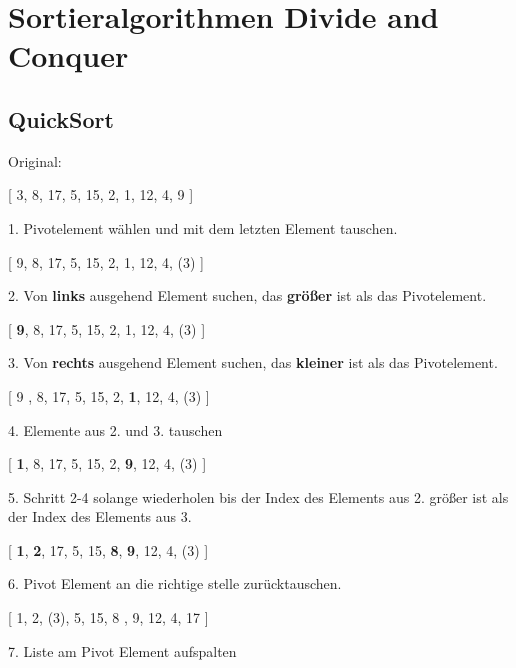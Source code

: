 \documentclass[12pt]{article}
\begin{document}
\section{Sortieralgorithmen Divide and Conquer}
\subsection{QuickSort}
\begin{center}
	Original:
\end{center}
\vspace{-0.8cm}
 \begin{center}
 	

 [ 3, 8, 17, 5, 15, 2, 1, 12, 4, 9 ]
 \end{center}
1. Pivotelement wählen und mit dem letzten Element tauschen.
 \begin{center}
	[ 9, 8, 17, 5, 15, 2, 1, 12, 4, (3) ]
\end{center}
2. Von \textbf{links} ausgehend Element suchen, das \textbf{größer} ist als das Pivotelement.

 \begin{center}
	[ \textbf{9}, 8, 17, 5, 15, 2, 1, 12, 4, (3) ]
\end{center}

3. Von \textbf{rechts} ausgehend Element suchen, das \textbf{kleiner} ist als das Pivotelement.

\begin{center}
	[ 9 , 8, 17, 5, 15, 2, \textbf{1}, 12, 4, (3) ]
\end{center}




4. Elemente aus 2. und 3. tauschen
\begin{center}
	[ \textbf{1}, 8, 17, 5, 15, 2, \textbf{9}, 12, 4, (3) ]
\end{center}

5. Schritt 2-4 solange wiederholen bis der Index des Elements aus 2. größer ist als der Index des Elements aus 3.

\begin{center}
	[ \textbf{1}, \textbf{2}, 17, 5, 15, \textbf{8}, \textbf{9}, 12, 4, (3) ]
\end{center}

6. Pivot Element an die richtige stelle zurücktauschen.

\begin{center}
	[ 1, 2, (3), 5, 15, 8 , 9, 12, 4, 17 ]
\end{center}

7. Liste am Pivot Element aufspalten
\end{document}
